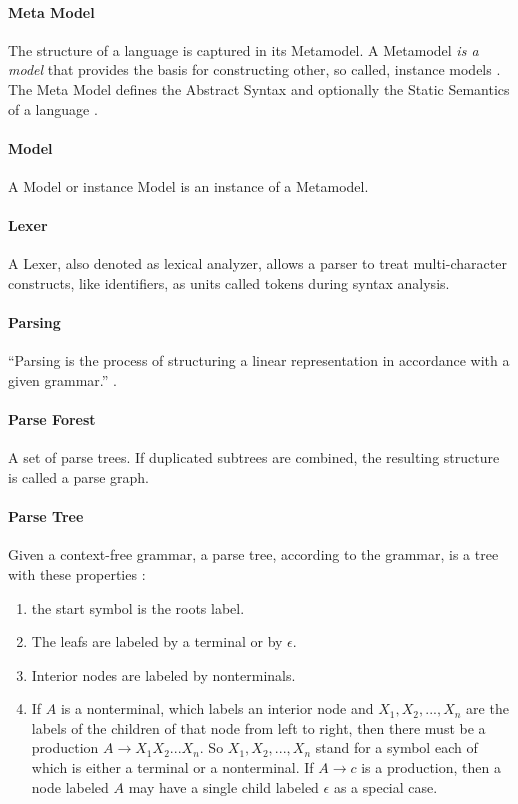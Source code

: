 \paragraph{Meta Model} The structure of a language is captured in its Metamodel. A Metamodel \emph{is a model} that provides the basis for constructing other, so called, instance models \cite{EMP}. The Meta Model defines the Abstract Syntax and optionally the Static Semantics of a language \cite{MDSD}.

\paragraph{Model} A Model or instance Model is an instance of a Metamodel.


\paragraph{Lexer}
A Lexer, also denoted as lexical analyzer, allows a parser to treat multi-character constructs, like identifiers, as units called tokens during syntax analysis. \cite{DragonBook}




\paragraph{Parsing} 
``Parsing is the process of structuring a linear representation in accordance with a given grammar.'' \cite{ParserBook}.

\paragraph{Parse Forest} 
A set of parse trees. If duplicated subtrees are combined, the resulting structure is called a parse graph. \cite{ParserBook}

\paragraph{Parse Tree}
Given a context-free grammar, a parse tree, according to the grammar, is a tree with these properties \cite{DragonBook}:
\begin{enumerate}
	\item the start symbol is the roots label.
	\item The leafs are labeled by a terminal or by $\epsilon$.
	\item Interior nodes are labeled by nonterminals.
	\item If $A$ is a nonterminal, which labels an interior node and $X_1, X_2, . . . , X_n$ are the labels of the children of that node from left to right, then there must be a production $A  \rightarrow X_1X_2 ... X_n$. So $X_1, X_2, ... , X_n$ stand for a symbol each of which is either a terminal or a nonterminal. If $A\rightarrow c$ is a production, then a node labeled $A$ may have a single child labeled $\epsilon$ as a special case. 
\end{enumerate}
